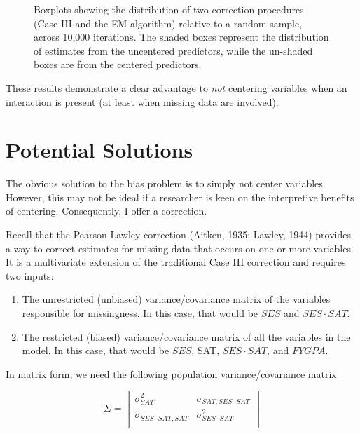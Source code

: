 \documentclass[english,man]{apa6}
\providecommand{\tightlist}{%
  \setlength{\itemsep}{0pt}\setlength{\parskip}{0pt}}
\theoremstyle{definition}
\theoremstyle{definition}
\theoremstyle{remark}
\begin{document}
\begin{figure}[htbp]
\begin{center}
\caption{Boxplots showing the distribution of two correction procedures (Case III and the EM algorithm) relative to a random sample, across 10,000 iterations. The shaded boxes represent the distribution of estimates from the uncentered predictors, while the un-shaded boxes are from the centered predictors. }
\label{fig:demo}
\end{center}
\end{figure}

These results demonstrate a clear advantage to \emph{not} centering
variables when an interaction is present (at least when missing data are
involved).

\section{Potential Solutions}\label{potential-solutions}

The obvious solution to the bias problem is to simply not center
variables. However, this may not be ideal if a researcher is keen on the
interpretive benefits of centering. Consequently, I offer a correction.

Recall that the Pearson-Lawley correction (Aitken, 1935; Lawley, 1944)
provides a way to correct estimates for missing data that occurs on one
or more variables. It is a multivariate extension of the traditional
Case III correction and requires two inputs:

\begin{enumerate}
\def\labelenumi{(\arabic{enumi})}
\tightlist
\item
  The unrestricted (unbiased) variance/covariance matrix of the
  variables responsible for missingness. In this case, that would be
  \(SES\) and \(SES\cdot SAT\).
\item
  The restricted (biased) variance/covariance matrix of all the
  variables in the model. In this case, that would be \(SES\), SAT,
  \(SES \cdot SAT\), and \(FYGPA\).
\end{enumerate}

In matrix form, we need the following population variance/covariance
matrix

\[
   \Sigma=
  \left[ {\begin{array}{ccc}
   \sigma^2_{SAT} & \sigma_{SAT,SES\cdot SAT} \\
    \sigma_{SES\cdot SAT, SAT} & \sigma^2_{SES \cdot SAT}  \\
  \end{array} } \right]
\]
\end{document}
